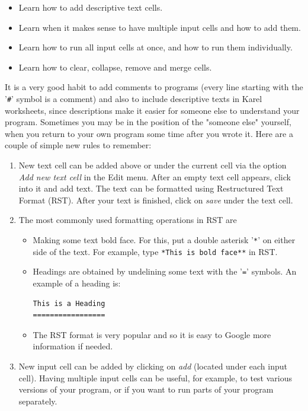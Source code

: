 \documentclass[article,A4,12pt]{llncs}
\begin{document}
{{{{\begin{itemize}
\item Learn how to add descriptive text cells.
\item Learn when it makes sense to have multiple input cells and how to add them.
\item Learn how to run all input cells at once, and how to run them individually.
\item Learn how to clear, collapse, remove and merge cells.
\end{itemize}
It is a very good habit to add comments to programs (every line starting with the '{\tt \#}'
symbol is a comment) and also to include descriptive 
texts in Karel worksheets, since descriptions make it easier for someone else to 
understand your program. Sometimes you may be in the position of the "someone else" yourself,
when you return to your own program some time after you wrote it. Here are a couple of 
simple new rules to remember:
\begin{enumerate} 
\item New text cell can be added above or under the current cell via the option 
      {\em Add new text cell} in the Edit menu. 
      After an empty text cell appears, click into it and add text. The text can be 
      formatted using Restructured Text Format (RST). After your text is finished, click 
      on {\em save} under the text cell. 
\item The most commonly used formatting operations in RST are 
      \begin{itemize}
      \item Making some text bold face. For this, put a double asterisk '{\tt **}' on either 
      side of the text. For example, type {\tt **This is bold face**} in RST.
      \item Headings are obtained by undelining some text with the '{\tt =}' symbols.
      An example of a heading is:
\begin{verbatim}
This is a Heading
=================
\end{verbatim}
      \item The RST format is very popular and so it is easy to Google more information
      if needed.
      \end{itemize}
\item New input cell can be added by clicking on {\em add} (located under each input cell). 
      Having multiple input cells can be useful, for example, to test various versions 
      of your program, or if you want to run parts of your program separately. 

\end{enumerate}}}}}
\end{document}
